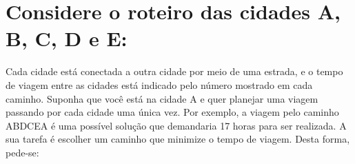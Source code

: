 \documentclass[paper=a4, fontsize=11pt]{scrartcl} %
\begin{document}
    
    \section{Considere o roteiro das cidades A, B, C, D e E:}
    

    \par{Cada cidade está conectada a outra cidade por meio de uma estrada, e o tempo de viagem entre as cidades está indicado pelo número mostrado em cada caminho. Suponha que você está na cidade A e quer planejar uma viagem passando por cada cidade uma única vez. Por exemplo, a viagem pelo caminho ABDCEA é uma possível solução que demandaria 17 horas para ser realizada. A sua tarefa é escolher um caminho que minimize o tempo de viagem. Desta forma, pede-se:}
\end{document}
